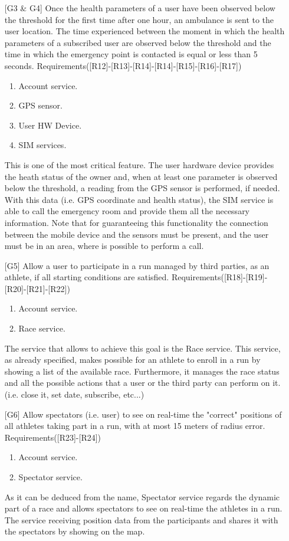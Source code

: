 \begin{itemize}
\item[{[G3 \& G4]}] Once the health parameters of a user have been observed below the threshold for the first time after one hour, an ambulance is sent to the user location. 
The time experienced between the moment in which the health parameters of a subscribed user are observed below the threshold and the time in which the emergency point is contacted is equal or less than 5 seconds. Requirements([R12]-[R13]-[R14]-[R14]-[R15]-[R16]-[R17])
	\begin{enumerate}
	\item Account service.
	\item GPS sensor.
	\item User HW Device.
	\item SIM services.
	\end{enumerate}
This is one of the most critical feature. 
The user hardware device provides the heath status of the owner and, when at least one parameter is observed below the threshold, a reading
from the GPS sensor is performed, if needed. 
With this data (i.e. GPS coordinate and health status), the SIM service is able to call the emergency room and provide them all the necessary 
information. 
Note that for guaranteeing this functionality the connection between the mobile device and the sensors must be present, and the user must be
in an area, where is possible to perform a call.

\item[{[G5]}] Allow a user to participate in a run managed by third parties, as an athlete, if all starting conditions are satisfied. Requirements([R18]-[R19]-[R20]-[R21]-[R22])
	\begin{enumerate}
	\item Account service.
	\item Race service.
	\end{enumerate}
The service that allows to achieve this goal is the Race service. 
This service, as already specified, makes possible for an athlete to enroll in a run by showing a list of the available race.
Furthermore, it manages the race status and all the possible actions that a user or the third party can perform on it. (i.e. close it, set
date, subscribe, etc...) 

\item[{[G6]}] Allow spectators (i.e. user) to see on real-time the "correct" positions of all athletes taking part in a run, with at most 15 meters of radius error.
Requirements([R23]-[R24])
	\begin{enumerate}
	\item Account service.
	\item Spectator service.
	\end{enumerate}
As it can be deduced from the name, Spectator service regards the dynamic part of a race and allows spectators to see on real-time the 
athletes in a run.
The service receiving position data from the participants and shares it with the spectators by showing on the map. 
	

\end{itemize}
